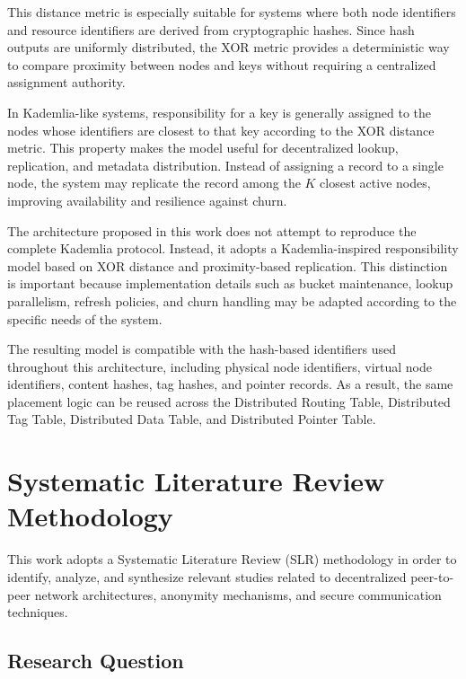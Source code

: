 \documentclass[
  12pt,
  oneside,
  a4paper,
  chapter=TITLE,
  section=TITLE,
  english,
  brazil
]{abntex2}
\begin{document}
This distance metric is especially suitable for systems where both node identifiers
and resource identifiers are derived from cryptographic hashes. Since hash outputs
are uniformly distributed, the XOR metric provides a deterministic way to compare
proximity between nodes and keys without requiring a centralized assignment
authority.

In Kademlia-like systems, responsibility for a key is generally assigned to the
nodes whose identifiers are closest to that key according to the XOR distance
metric. This property makes the model useful for decentralized lookup, replication,
and metadata distribution. Instead of assigning a record to a single node, the
system may replicate the record among the \(K\) closest active nodes, improving
availability and resilience against churn.

The architecture proposed in this work does not attempt to reproduce the complete
Kademlia protocol. Instead, it adopts a Kademlia-inspired responsibility model based
on XOR distance and proximity-based replication. This distinction is important
because implementation details such as bucket maintenance, lookup parallelism,
refresh policies, and churn handling may be adapted according to the specific needs
of the system.

\enlargethispage{3\baselineskip}
The resulting model is compatible with the hash-based identifiers used throughout
this architecture, including physical node identifiers, virtual node identifiers,
content hashes, tag hashes, and pointer records. As a result, the same placement
logic can be reused across the Distributed Routing Table, Distributed Tag Table,
Distributed Data Table, and Distributed Pointer Table.







\chapter{Systematic Literature Review Methodology}

This work adopts a Systematic Literature Review (SLR) methodology in order to identify, analyze, and synthesize relevant studies related to decentralized peer-to-peer network architectures, anonymity mechanisms, and secure communication techniques.

\section{Research Question}
\end{document}
